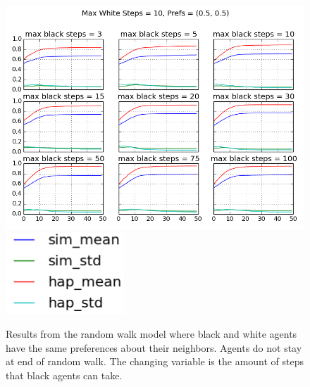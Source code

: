 \documentclass[11pt,twoside]{amsart}
\theoremstyle{theorem}
\theoremstyle{definition}
\theoremstyle{remark}
\begin{document}
    \begin{figure}[p]
        \center
        \includegraphics[scale=0.60]{rw_mixed_walk_same_prefs.png}
        \includegraphics[scale=0.40]{no_stay_at_end_legend.png}
        \caption{Results from the random walk model where black and white agents have the same preferences about their neighbors. Agents do not stay at end of random walk. The changing variable is the amount of steps that black agents can take.}
        \label{fig:rw_same_prefs}
    \end{figure}
% 
\end{document}
